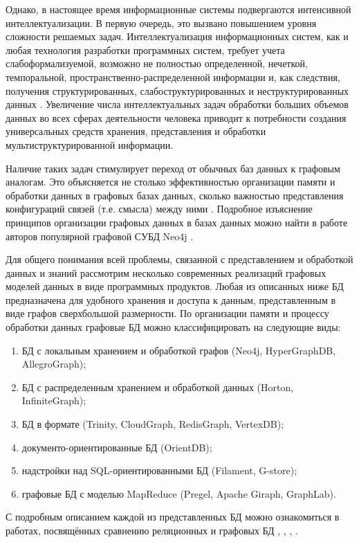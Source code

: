 Однако, в настоящее время информационные системы подвергаются интенсивной интеллектуализации. В первую очередь, это вызвано повышением уровня сложности решаемых задач. Интеллектуализация информационных систем, как и любая технология разработки программных систем, требует учета слабоформализуемой, возможно не полностью определенной, нечеткой, темпоральной, пространственно-распределенной информации и, как следствия, получения структурированных, слабоструктурированных и неструктурированных данных \cite{Rudikova2018}. Увеличение числа интеллектуальных задач обработки больших объемов данных во всех сферах деятельности человека приводит к потребности создания универсальных средств хранения, представления и обработки мультиструктурированной информации.

Наличие таких задач стимулирует переход от обычных баз данных к графовым аналогам. Это объясняется не столько эффективностью организации памяти и обработки данных в графовых базах данных, сколько важностью представления конфигураций связей (т.е. смысла) между ними \cite{bai2022platform}. Подробное изъяснение принципов организации графовых данных в базах данных можно найти в работе авторов популярной графовой СУБД Neo4j \cite{GDB}.

Для общего понимания всей проблемы, связанной с представлением и обработкой данных и знаний рассмотрим несколько современных реализаций графовых моделей данных в виде программных продуктов. Любая из описанных ниже БД предназначена для удобного хранения и доступа к данным, представленным в виде графов сверхбольшой размерности. По организации памяти и процессу обработки данных графовые БД можно классифицировать на следующие виды:
\begin{enumerate}
    \item БД с локальным хранением и обработкой графов (Neo4j, HyperGraphDB, AllegroGraph);
    \item БД с распределенным хранением и обработкой данных (Horton, InfiniteGraph);
    \item БД в формате  (Trinity, CloudGraph, RedisGraph, VertexDB);
    \item документо-ориентированные БД (OrientDB);
    \item надстройки над SQL-ориентированными БД (Filament, G-store);
    \item графовые БД с моделью MapReduce (Pregel, Apache Giraph, GraphLab).
\end{enumerate}

С подробным описанием каждой из представленных БД можно ознакомиться в работах, посвящённых сравнению  реляционных и графовых БД \cite{AbramskiyDB2018}, \cite{vicknair2010comparison}, \cite{Klimanskaya2014}, \cite{chen2022multi}.

